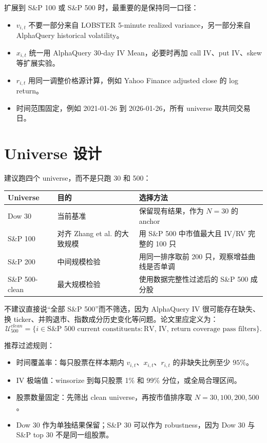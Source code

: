 \documentclass[11pt,a4paper]{ctexart}
\begin{document}
扩展到 S\&P 100 或 S\&P 500 时，最重要的是保持同一口径：

\begin{itemize}[leftmargin=*]
\item \(v_{i,t}\) 不要一部分来自 LOBSTER 5-minute realized variance，另一部分来自 AlphaQuery historical volatility。
\item \(x_{i,t}\) 统一用 AlphaQuery 30-day IV Mean，必要时再加 call IV、put IV、skew 等扩展实验。
\item \(r_{i,t}\) 用同一调整价格源计算，例如 Yahoo Finance adjusted close 的 log return。
\item 时间范围固定，例如 2021-01-26 到 2026-01-26，所有 universe 取共同交易日。
\end{itemize}

\section{Universe 设计}

建议跑四个 universe，而不是只跑 30 和 500：

\begin{longtable}{lll}
\toprule
Universe & 目的 & 选择方法 \\
\midrule
\endhead
Dow 30 & 当前基准 & 保留现有结果，作为 \(N=30\) 的 anchor \\
S\&P 100 & 对齐 Zhang et al. 的大致规模 & 用 S\&P 500 中市值最大且 IV/RV 完整的 100 只 \\
S\&P 200 & 中间规模检验 & 用同一排序取前 200 只，观察增益曲线是否单调 \\
S\&P 500-clean & 最大规模检验 & 使用数据完整性过滤后的 S\&P 500 成分股 \\
\bottomrule
\end{longtable}

不建议直接说“全部 S\&P 500”而不筛选，因为 AlphaQuery IV 很可能存在缺失、换 ticker、并购退市、指数成分历史变化等问题。论文里应定义为：
\[
\mathcal{U}_{500}^{clean}
=
\{i\in \text{S\&P 500 current constituents}: \text{RV, IV, return coverage pass filters}\}.
\]

推荐过滤规则：

\begin{itemize}[leftmargin=*]
\item 时间覆盖率：每只股票在样本期内 \(v_{i,t}\)、\(x_{i,t}\)、\(r_{i,t}\) 的非缺失比例至少 \(95\%\)。
\item IV 极端值：winsorize 到每只股票 1\% 和 99\% 分位，或全局合理区间。
\item 股票数量固定：先筛出 clean universe，再按市值排序取 \(N=30,100,200,500\)。
\item Dow 30 作为单独结果保留；S\&P 30 可以作为 robustness，因为 Dow 30 与 S\&P top 30 不是同一组股票。
\end{itemize}
\end{document}
